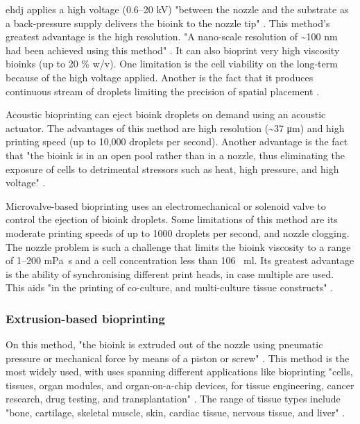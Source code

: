 \gls{ehdj} applies a high voltage (\numrange{0.6}{20} \si{\kilo\volt}) "between the nozzle and the substrate as a back-pressure supply delivers the bioink to the nozzle tip" \cite{Vijayavenkataraman2018_bioprinting_tissues_organs_regen_med}. This method's greatest advantage is the high resolution. "A nano-scale resolution of \textasciitilde 100 \si{\nano\meter} had been achieved using this method" \cite{Vijayavenkataraman2018_bioprinting_tissues_organs_regen_med}. It can also bioprint very high viscosity bioinks (up to 20 \% w/v). One limitation is the cell viability on the long-term because of the high voltage applied. Another is the fact that it produces continuous stream of droplets limiting the precision of spatial placement \cite{Vijayavenkataraman2018_bioprinting_tissues_organs_regen_med}.

Acoustic bioprinting can eject bioink droplets on demand using an acoustic actuator. The advantages of this method are high resolution (\textasciitilde 37 \si{\micro\meter}) and high printing speed (up to 10,000 droplets per second). Another advantage is the fact that "the
bioink is in an open pool rather than in a nozzle, thus eliminating the exposure of cells to detrimental stressors such as heat, high pressure, and high voltage" \cite{Vijayavenkataraman2018_bioprinting_tissues_organs_regen_med}.

Microvalve-based bioprinting uses an electromechanical or solenoid valve to control the ejection of bioink droplets. Some limitations of this method are its moderate printing speeds of up to 1000 droplets per second, and nozzle clogging. The nozzle problem is such a challenge that limits the bioink viscosity to a range of \numrange{1}{200} \si{\milli\pascal\second} and a cell concentration less than 106 \si{\per\milli\litre}. Its greatest advantage is the ability of synchronising different print heads, in case multiple are used. This aids "in the printing of co-culture, and multi-culture tissue constructs" \cite{Vijayavenkataraman2018_bioprinting_tissues_organs_regen_med}.


\subsubsection{Extrusion-based bioprinting}
\label{subsubsec:extrusion_based_bioprinting}

On this method, "the bioink is extruded out of the nozzle using pneumatic pressure or mechanical force by means of a piston or screw" \cite{Vijayavenkataraman2018_bioprinting_tissues_organs_regen_med}. This method is the most widely used, with uses spanning different applications like bioprinting "cells, tissues, organ modules, and organ-on-a-chip devices, for tissue engineering, cancer research, drug testing, and transplantation" \cite{Vijayavenkataraman2018_bioprinting_tissues_organs_regen_med}. The range of tissue types include "bone, cartilage, skeletal muscle, skin, cardiac tissue, nervous tissue, and liver" \cite{Vijayavenkataraman2018_bioprinting_tissues_organs_regen_med}.

